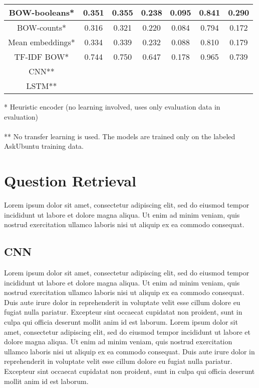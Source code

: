 \documentclass[12pt]{article}
\begin{document}
\begin{center}
\begin{tabular}{|c||c|c|c|c||c|c|}
			\cellcolor{red!15}BOW-booleans* & 0.351 & 0.355 & 0.238 & 0.095 & 0.841 & 0.290 \\ \hline
			\cellcolor{red!15}BOW-counts* & 0.316 & 0.321 & 0.220 & 0.084 & 0.794 & 0.172 \\ \hline
			\cellcolor{red!15}Mean embeddings* & 0.334 & 0.339 & 0.232 & 0.088 & 0.810 & 0.179 \\ \hline
			\cellcolor{red!15}TF-IDF BOW* & 0.744 & 0.750 & 0.647 & 0.178 & 0.965 & 0.739 \\ \hline\hline
			\cellcolor{green!15}CNN** &  &  &  &  &  &  \\ \hline
			\cellcolor{green!15}LSTM** &  &  &  &  &  &  \\ \hline
		\end{tabular}
	\end{center}
	* Heuristic encoder (no learning involved, uses only evaluation data in evaluation) \\\\
	** No transfer learning is used. The models are trained only on the labeled AskUbuntu training data.

\section{Question Retrieval}
Lorem ipsum dolor sit amet, consectetur adipiscing elit, sed do eiusmod tempor incididunt ut labore et dolore magna aliqua. Ut enim ad minim veniam, quis nostrud exercitation ullamco laboris nisi ut aliquip ex ea commodo consequat.

\subsection{CNN}
Lorem ipsum dolor sit amet, consectetur adipiscing elit, sed do eiusmod tempor incididunt ut labore et dolore magna aliqua. Ut enim ad minim veniam, quis nostrud exercitation ullamco laboris nisi ut aliquip ex ea commodo consequat. Duis aute irure dolor in reprehenderit in voluptate velit esse cillum dolore eu fugiat nulla pariatur. Excepteur sint occaecat cupidatat non proident, sunt in culpa qui officia deserunt mollit anim id est laborum. Lorem ipsum dolor sit amet, consectetur adipiscing elit, sed do eiusmod tempor incididunt ut labore et dolore magna aliqua. Ut enim ad minim veniam, quis nostrud exercitation ullamco laboris nisi ut aliquip ex ea commodo consequat. Duis aute irure dolor in reprehenderit in voluptate velit esse cillum dolore eu fugiat nulla pariatur. Excepteur sint occaecat cupidatat non proident, sunt in culpa qui officia deserunt mollit anim id est laborum.
\end{document}
